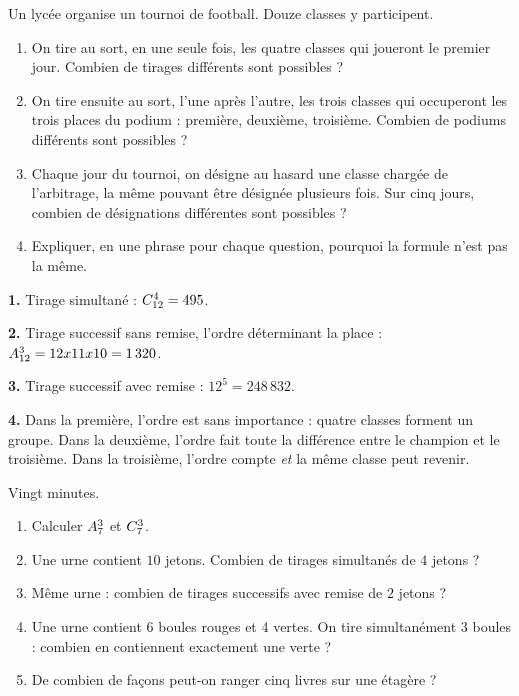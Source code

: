\begin{situation}
Un lycée organise un tournoi de football. Douze classes y participent.

\begin{enumerate}[label=\textbf{\arabic*.}, leftmargin=*, itemsep=0.3em]
  \item On tire au sort, en une seule fois, les quatre classes qui joueront
        le premier jour. Combien de tirages différents sont possibles ?
  \item On tire ensuite au sort, l'une après l'autre, les trois classes qui
        occuperont les trois places du podium : première, deuxième,
        troisième. Combien de podiums différents sont possibles ?
  \item Chaque jour du tournoi, on désigne au hasard une classe chargée de
        l'arbitrage, la même pouvant être désignée plusieurs fois. Sur cinq
        jours, combien de désignations différentes sont possibles ?
  \item Expliquer, en une phrase pour chaque question, pourquoi la formule
        n'est pas la même.
\end{enumerate}
\end{situation}

\begin{corrige}
\textbf{1.} Tirage simultané : $\combi{4}{12} = 495$.

\textbf{2.} Tirage successif sans remise, l'ordre déterminant la place :
$\arrang{3}{12} = 12\times11\times10 = 1\,320$.

\textbf{3.} Tirage successif avec remise : $12^{5} = 248\,832$.

\textbf{4.} Dans la première, l'ordre est sans importance : quatre classes
forment un groupe. Dans la deuxième, l'ordre fait toute la différence entre
le champion et le troisième. Dans la troisième, l'ordre compte \emph{et} la
même classe peut revenir.
\end{corrige}

\begin{jemeteste}
Vingt minutes.

\begin{enumerate}[label=\textbf{\arabic*.}, leftmargin=*, itemsep=0.3em]
  \item Calculer $\arrang{3}{7}$ et $\combi{3}{7}$.
  \item Une urne contient $10$ jetons. Combien de tirages simultanés de $4$
        jetons ?
  \item Même urne : combien de tirages successifs avec remise de $2$
        jetons ?
  \item Une urne contient $6$ boules rouges et $4$ vertes. On tire
        simultanément $3$ boules : combien en contiennent exactement une
        verte ?
  \item De combien de façons peut-on ranger cinq livres sur une étagère ?
\end{enumerate}
\end{jemeteste}

